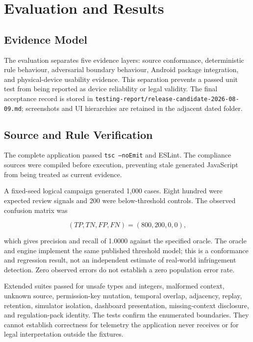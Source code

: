 \section{Evaluation and Results}

\subsection{Evidence Model}

The evaluation separates five evidence layers: source conformance, deterministic rule behaviour, adversarial boundary behaviour, Android package integration, and physical-device usability evidence. This separation prevents a passed unit test from being reported as device reliability or legal validity. The final acceptance record is stored in \texttt{testing-report/release-candidate-2026-08-09.md}; screenshots and UI hierarchies are retained in the adjacent dated folder.

\subsection{Source and Rule Verification}

The complete application passed \texttt{tsc --noEmit} and ESLint. The compliance sources were compiled before execution, preventing stale generated JavaScript from being treated as current evidence.

A fixed-seed logical campaign generated 1,000 cases. Eight hundred were expected review signals and 200 were below-threshold controls. The observed confusion matrix was

\begin{equation}
(TP,TN,FP,FN)=(800,200,0,0),
\end{equation}

which gives precision and recall of 1.0000 against the specified oracle. The oracle and engine implement the same published threshold model; this is a conformance and regression result, not an independent estimate of real-world infringement detection. Zero observed errors do not establish a zero population error rate.

Extended suites passed for unsafe types and integers, malformed context, unknown source, permission-key mutation, temporal overlap, adjacency, replay, retention, simulator isolation, dashboard presentation, missing-context disclosure, and regulation-pack identity. The tests confirm the enumerated boundaries. They cannot establish correctness for telemetry the application never receives or for legal interpretation outside the fixtures.

